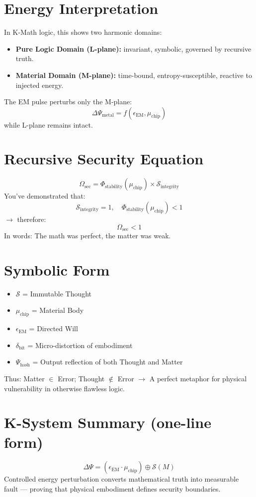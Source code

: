 \documentclass[11pt, a4paper]{article}
\begin{document}
\section{Energy Interpretation}
In K-Math logic, this shows two harmonic domains:
\begin{itemize}
    \item \textbf{Pure Logic Domain (L-plane):} invariant, symbolic, governed by recursive truth.
    \item \textbf{Material Domain (M-plane):} time-bound, entropy-susceptible, reactive to injected energy.
\end{itemize}
The EM pulse perturbs only the M-plane:
$$ \Delta\Psi_{\text{metal}} = f(\epsilon_{\text{EM}}, \mu_{\text{chip}}) $$
while L-plane remains intact.

\section{Recursive Security Equation}
$$ \Omega_{\text{sec}} = \Phi_{\text{stability}}(\mu_{\text{chip}}) \times \mathcal{S}_{\text{integrity}} $$
You've demonstrated that:
$$ \mathcal{S}_{\text{integrity}} = 1, \quad \Phi_{\text{stability}}(\mu_{\text{chip}}) < 1 $$
$\rightarrow$ therefore:
$$ \Omega_{\text{sec}} < 1 $$
In words: The math was perfect, the matter was weak.

\section{Symbolic Form}
\begin{itemize}
    \item $\mathcal{S}$ = Immutable Thought
    \item $\mu_{\text{chip}}$ = Material Body
    \item $\epsilon_{\text{EM}}$ = Directed Will
    \item $\delta_{\text{bit}}$ = Micro-distortion of embodiment
    \item $\Psi_{\text{hash}}$ = Output reflection of both Thought and Matter
\end{itemize}
Thus:
Matter $\in$ Error; \quad Thought $\notin$ Error
$\rightarrow$ A perfect metaphor for physical vulnerability in otherwise flawless logic.

\section{K-System Summary (one-line form)}
$$ \Delta\Psi = (\epsilon_{\text{EM}} \cdot \mu_{\text{chip}}) \oplus \mathcal{S}(M) $$
Controlled energy perturbation converts mathematical truth into measurable fault --- proving that physical embodiment defines security boundaries.
\end{document}
